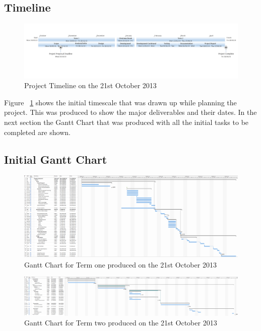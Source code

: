 \newpage 
\begin{landscape}


\subsection{Timeline}

\begin{figure}[H]
  \centering
  \includegraphics[width=\linewidth]{images/timeline1.png}
  \caption{Project Timeline on the 21st October 2013}
  \label{fig:timeline1}
\end{figure}

Figure ~\ref{fig:timeline1} shows the initial timescale that was drawn up while planning the project. This was produced to show the major deliverables and their dates. In the next section the Gantt Chart that was produced with all the initial tasks to be completed are shown. 

\newpage 
\subsection{Initial Gantt Chart}

\begin{figure}[H]
  \centering
  \includegraphics[width=\linewidth]{images/gant_chart1_term1.png}
  \caption{Gantt Chart for Term one produced on the 21st October 2013}
  \label{fig:ganttinitialterm1}
\end{figure}

\begin{figure}[H]
  \centering
  \includegraphics[width=\linewidth]{images/gant_chart1_term2.png}
  \caption{Gantt Chart for Term two produced on the 21st October 2013}
  \label{fig:ganttinitialterm2}
\end{figure}


\end{landscape}
